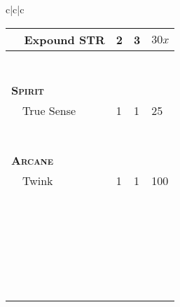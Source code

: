 \documentclass{article}
\begin{document}
\begin{tabular}{c|c|c}
\begin{tabular}{p{1.4in}|p{.2in}|p{.2in}|p{.2in}}
    ~~Expound STR & 2 & 3 & $30x$ \\
    \hline
    & & & \\
    \hline
    & & & \\
    \hline
    & & & \\
    \hline
    & & & \\
    \hline
    & & & \\
    \hline
    & & & \\
    \hline
    & & & \\
    \hline
    \hline
    \hline
    \textsc{\textbf{Spirit}} & & & \\
    \hline
    ~~True Sense & 1 & 1 & 25 \\
    \hline
    & & & \\
    \hline
    & & & \\
    \hline
    & & & \\
    \hline
    & & & \\
    \hline
    & & & \\
    \hline
    & & & \\
    \hline
    & & & \\
    \hline
    \hline
    \hline
    \textsc{\textbf{Arcane}} & & & \\
    \hline
    ~~Twink & 1 & 1 & 100 \\
    \hline
    & & & \\
    \hline
    & & & \\
    \hline
    & & & \\
    \hline
    & & & \\
    \hline
    & & & \\
    \hline
    & & & \\
    \hline
    & & & \\
    \hline
    & & & \\
    \hline
    & & & \\
    \hline
    & & & \\
    \hline
    & & & \\
    \hline
    & & & \\
    \hline
    & & & \\
    \hline
    & & & \\
    \hline
    & & & \\
    \hline
    & & & \\
    \hline
    & & & \\
    \hline
    & & & \\
    \hline
    & & & \\
    \hline
    & & & \\
    \hline
    & & & \\
    \hline
    & & & \\
    \hline
    & & & \\
    \hline
    & & & \\
    \hline
    & & & \\
    \hline
    & & & \\
  \end{tabular} \\
\end{tabular}
\end{document}
